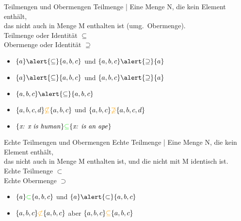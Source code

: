 \begin{frame}
  {Teilmengen und Obermengen}
  \onslide<+->
  \onslide<+->
  \alert{Teilmenge} | Eine Menge N, die kein Element enthält,\\
  das nicht auch in Menge M enthalten ist (umg.\ \alert{Obermenge}).\\
  \Halbzeile
  \onslide<+->
  Teilmenge oder Identität $\subseteq$\\
  Obermenge oder Identität $\supseteq$\\
  \Zeile
  \begin{itemize}[<+->]
    \item $\{a\}\alert{\subseteq}\{a,b,c\}$ und $\{a,b,c\}\alert{\supseteq}\{a\}$
    \item $\{a\} \alert{\subseteq}\{a,b,c\}$ und $\{a,b,c\}\alert{\supseteq}\{a\}$
    \item $\{a,b,c\}\alert{\subseteq}\{a,b,c\}$
      \Halbzeile
    \item $\{a,b,c,d\}\orongsch{\not\subseteq}\{a,b,c\}$ und $\{a,b,c\}\orongsch{\not\supseteq}\{a,b,c,d\}$
      \Halbzeile
    \item $\{\text{\textit{x: x is human}}\}\gruen{\subseteq}\{\text{\textit{x: is an ape}}\}$
  \end{itemize}
\end{frame}


\begin{frame}
  {Echte Teilmengen und Obermengen}
  \onslide<+->
  \onslide<+->
  \alert{Echte Teilmenge} | Eine Menge N, die kein Element enthält,\\
  das nicht auch in Menge M enthalten ist, und die nicht mit M identisch ist.\\
  \Halbzeile
  \onslide<+->
  Echte Teilmenge $\subset$\\
  Echte Obermenge $\supset$\\
  \Zeile
  \begin{itemize}[<+->]
    \item $\{a\}\gruen{\subset}\{a,b,c\}$ und $\{a\}\alert{\subset}\{a,b,c\}$
    \item $\{a,b,c\}\orongsch{\not\subset}\{a,b,c\}$ aber $\{a,b,c\}\orongsch{\subseteq}\{a,b,c\}$
  \end{itemize}
\end{frame}

